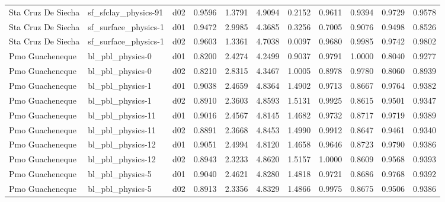 \begin{longtable}{lllrrrrrrrr}
   Sta Cruz De Siecha  &  sf\_sfclay\_physics-91 &     d02 &   0.9596 &   1.3791 &   4.9094 &       0.2152 &        0.9611 &       0.9394 &           0.9729 &  0.9578 \\
   Sta Cruz De Siecha  &  sf\_surface\_physics-1 &     d01 &   0.9472 &   2.9985 &   4.3685 &       0.3256 &        0.7005 &       0.9076 &           0.9498 &  0.8526 \\
   Sta Cruz De Siecha  &  sf\_surface\_physics-1 &     d02 &   0.9603 &   1.3361 &   4.7038 &       0.0097 &        0.9680 &       0.9985 &           0.9742 &  0.9802 \\
      Pmo Guacheneque  &      bl\_pbl\_physics-0 &     d01 &   0.8200 &   2.4274 &   4.2499 &       0.9037 &        0.9791 &       1.0000 &           0.8040 &  0.9277 \\
      Pmo Guacheneque  &      bl\_pbl\_physics-0 &     d02 &   0.8210 &   2.8315 &   4.3467 &       1.0005 &        0.8978 &       0.9780 &           0.8060 &  0.8939 \\
      Pmo Guacheneque  &      bl\_pbl\_physics-1 &     d01 &   0.9038 &   2.4659 &   4.8364 &       1.4902 &        0.9713 &       0.8667 &           0.9764 &  0.9382 \\
      Pmo Guacheneque  &      bl\_pbl\_physics-1 &     d02 &   0.8910 &   2.3603 &   4.8593 &       1.5131 &        0.9925 &       0.8615 &           0.9501 &  0.9347 \\
      Pmo Guacheneque  &     bl\_pbl\_physics-11 &     d01 &   0.9016 &   2.4567 &   4.8145 &       1.4682 &        0.9732 &       0.8717 &           0.9719 &  0.9389 \\
      Pmo Guacheneque  &     bl\_pbl\_physics-11 &     d02 &   0.8891 &   2.3668 &   4.8453 &       1.4990 &        0.9912 &       0.8647 &           0.9461 &  0.9340 \\
      Pmo Guacheneque  &     bl\_pbl\_physics-12 &     d01 &   0.9051 &   2.4994 &   4.8120 &       1.4658 &        0.9646 &       0.8723 &           0.9790 &  0.9386 \\
      Pmo Guacheneque  &     bl\_pbl\_physics-12 &     d02 &   0.8943 &   2.3233 &   4.8620 &       1.5157 &        1.0000 &       0.8609 &           0.9568 &  0.9393 \\
      Pmo Guacheneque  &      bl\_pbl\_physics-5 &     d01 &   0.9040 &   2.4621 &   4.8280 &       1.4818 &        0.9721 &       0.8686 &           0.9768 &  0.9392 \\
      Pmo Guacheneque  &      bl\_pbl\_physics-5 &     d02 &   0.8913 &   2.3356 &   4.8329 &       1.4866 &        0.9975 &       0.8675 &           0.9506 &  0.9386 \\

\end{longtable}
